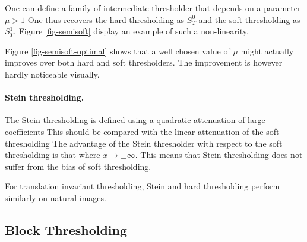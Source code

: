 One can define a family of intermediate thresholder that depends on a parameter $\mu>1$
One thus recovers the hard thresholding as $S_T^0$ and the soft thresholding as $S_T^1$.
Figure \ref{fig-semisoft} display an example of such a non-linearity.


Figure \ref{fig-semisoft-optimal} shows that a well chosen value of $\mu$ might actually improves over both hard and soft thresholders. The improvement is however hardly noticeable visually.  


\paragraph{Stein thresholding.}

The Stein thresholding is defined using a quadratic attenuation of large coefficients
This should be compared with the linear attenuation of the soft thresholding
The advantage of the Stein thresholder with respect to the soft thresholding is that
where $x \rightarrow \pm \infty$. This means that Stein thresholding does not suffer from the bias of soft thresholding.


For translation invariant thresholding, Stein and hard thresholding perform similarly on natural images.

\subsection{Block Thresholding}

